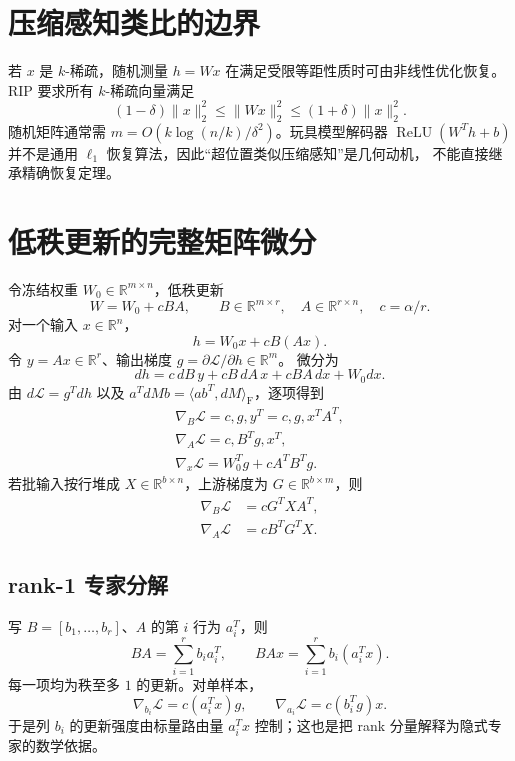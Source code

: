 \documentclass[11pt]{article}
\numberwithin{equation}{section}
\newcommand{\R}{\mathbb{R}}
\newcommand{\1}{\mathbf{1}}
\newcommand{\F}{\mathrm{F}}
\newcommand{\cL}{\mathcal{L}}
\begin{document}
\section{压缩感知类比的边界}

若 $x$ 是 $k$-稀疏，随机测量 $h=Wx$ 在满足受限等距性质时可由非线性优化恢复。
RIP 要求所有 $k$-稀疏向量满足
\begin{equation}
 (1-\delta)\|x\|_2^2\le\|Wx\|_2^2\le(1+\delta)\|x\|_2^2.
\end{equation}
随机矩阵通常需 $m=O(k\log(n/k)/\delta^2)$。玩具模型解码器
$\operatorname{ReLU}(W^T h+b)$ 并不是通用 $\ell_1$ 恢复算法，因此“超位置类似压缩感知”是几何动机，
不能直接继承精确恢复定理。

\section{低秩更新的完整矩阵微分}

令冻结权重 $W_0\in\R^{m\times n}$，低秩更新
\begin{equation}
 W=W_0+cBA,\qquad
 B\in\R^{m\times r},\quad A\in\R^{r\times n},\quad c=\alpha/r.
\end{equation}
对一个输入 $x\in\R^n$，
\begin{equation}
 h=W_0x+cB(Ax).
\end{equation}
令 $y=Ax\in\R^r$、输出梯度 $g=\partial\cL/\partial h\in\R^m$。
微分为
\begin{equation}
 dh=c\,dB\,y+cB\,dA\,x+cBA\,dx+W_0dx.
\end{equation}
由 $d\cL=g^Tdh$ 以及
$a^TdMb=\langle ab^T,dM\rangle_\F$，逐项得到
\begin{align}
 \boxed{\nabla_B\cL=c,g,y^T=c,g,x^TA^T,}\\
 \boxed{\nabla_A\cL=c,B^Tg,x^T,}\\
 \boxed{\nabla_x\cL=W_0^Tg+cA^TB^Tg.}
\end{align}
若批输入按行堆成 $X\in\R^{b\times n}$，上游梯度为
$G\in\R^{b\times m}$，则
\begin{align}
 \nabla_B\cL&=cG^TXA^T,\\
 \nabla_A\cL&=cB^TG^TX.
\end{align}

\subsection{rank-1 专家分解}

写 $B=[b_1,\ldots,b_r]$、$A$ 的第 $i$ 行为 $a_i^T$，则
\begin{equation}
 BA=\sum_{i=1}^{r}b_i a_i^T,
 \qquad BAx=\sum_{i=1}^{r}b_i(a_i^Tx).
\end{equation}
每一项均为秩至多 $1$ 的更新。对单样本，
\begin{equation}
 \nabla_{b_i}\cL=c(a_i^Tx)g,\qquad
 \nabla_{a_i}\cL=c(b_i^Tg)x.
\end{equation}
于是列 $b_i$ 的更新强度由标量路由量 $a_i^Tx$ 控制；这也是把 rank 分量解释为隐式专家的数学依据。
\end{document}
